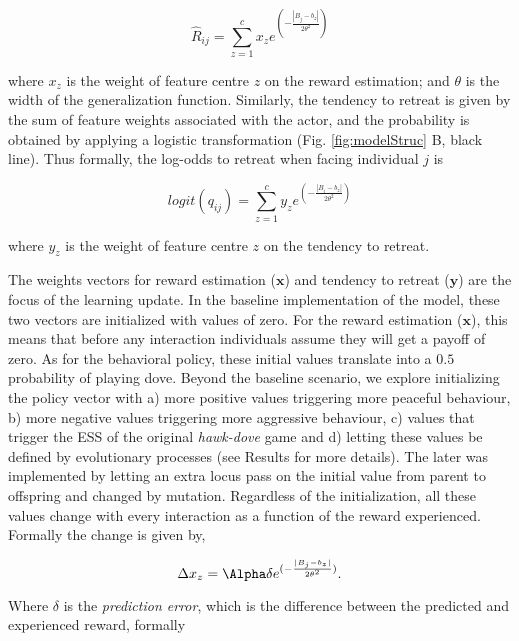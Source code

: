 \documentclass[
  12pt,
]{article}
\begin{document}
\begin{equation}
\hat{R}_{ij} =  \sum_{z=1}^{c} x_z e^{(-\frac{|B_j-b_z|}{2\theta^2})} 
\end{equation}

where \(x_z\) is the weight of feature centre \(z\) on the reward
estimation; and \(\theta\) is the width of the generalization function.
Similarly, the tendency to retreat is given by the sum of feature
weights associated with the actor, and the probability is obtained by
applying a logistic transformation (Fig. \ref{fig:modelStruc} B, black
line). Thus formally, the log-odds to retreat when facing individual
\(j\) is

\begin{equation}
logit(q_{ij}) =  \sum_{z=1}^{c} y_z e^{(-\frac{|B_i-b_z|}{2\theta^2})} 
\end{equation}

where \(y_z\) is the weight of feature centre \(z\) on the tendency to
retreat.

The weights vectors for reward estimation (\(\symbf{x}\)) and tendency
to retreat (\(\symbf{y}\)) are the focus of the learning update. In the
baseline implementation of the model, these two vectors are initialized
with values of zero. For the reward estimation (\(\symbf{x}\)), this
means that before any interaction individuals assume they will get a
payoff of zero. As for the behavioral policy, these initial values
translate into a \(0.5\) probability of playing dove. Beyond the
baseline scenario, we explore initializing the policy vector with a)
more positive values triggering more peaceful behaviour, b) more
negative values triggering more aggressive behaviour, c) values that
trigger the ESS of the original \emph{hawk-dove} game and d) letting
these values be defined by evolutionary processes (see Results for more
details). The later was implemented by letting an extra locus pass on
the initial value from parent to offspring and changed by mutation.
Regardless of the initialization, all these values change with every
interaction as a function of the reward experienced. Formally the change
is given by,

\begin{equation}
  \Delta x_z = \Alpha \delta e^{(-\frac{|B_j-b_z|}{2\theta^2})} \textrm{.}
  \label{eq:critic}
\end{equation}

Where \(\delta\) is the \emph{prediction error}, which is the difference
between the predicted and experienced reward, formally
\end{document}
